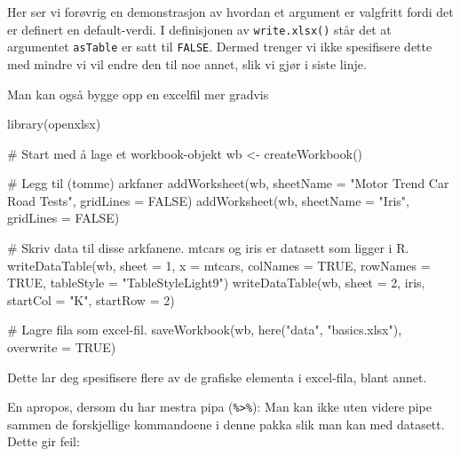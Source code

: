 \documentclass[
  letterpaper,
  DIV=11,
  numbers=noendperiod]{scrreprt}
\newenvironment{Shaded}{\begin{snugshade}}{\end{snugshade}}
\newcommand{\AttributeTok}[1]{\textcolor[rgb]{0.40,0.45,0.13}{#1}}
\newcommand{\CommentTok}[1]{\textcolor[rgb]{0.37,0.37,0.37}{#1}}
\newcommand{\ConstantTok}[1]{\textcolor[rgb]{0.56,0.35,0.01}{#1}}
\newcommand{\DecValTok}[1]{\textcolor[rgb]{0.68,0.00,0.00}{#1}}
\newcommand{\FunctionTok}[1]{\textcolor[rgb]{0.28,0.35,0.67}{#1}}
\newcommand{\NormalTok}[1]{\textcolor[rgb]{0.00,0.23,0.31}{#1}}
\newcommand{\OtherTok}[1]{\textcolor[rgb]{0.00,0.23,0.31}{#1}}
\newcommand{\StringTok}[1]{\textcolor[rgb]{0.13,0.47,0.30}{#1}}
\begin{document}
Her ser vi forøvrig en demonstrasjon av hvordan et argument er valgfritt
fordi det er definert en default-verdi. I definisjonen av
\texttt{write.xlsx()} står det at argumentet \texttt{asTable} er satt
til \texttt{FALSE}. Dermed trenger vi ikke spesifisere dette med mindre
vi vil endre den til noe annet, slik vi gjør i siste linje.

Man kan også bygge opp en excelfil mer gradvis

\begin{Shaded}
\begin{Highlighting}[]
\FunctionTok{library}\NormalTok{(openxlsx)}

\CommentTok{\# Start med å lage et workbook{-}objekt}
\NormalTok{wb }\OtherTok{\textless{}{-}} \FunctionTok{createWorkbook}\NormalTok{()}

\CommentTok{\# Legg til (tomme) arkfaner}
\FunctionTok{addWorksheet}\NormalTok{(wb, }\AttributeTok{sheetName =} \StringTok{"Motor Trend Car Road Tests"}\NormalTok{, }\AttributeTok{gridLines =} \ConstantTok{FALSE}\NormalTok{)}
\FunctionTok{addWorksheet}\NormalTok{(wb, }\AttributeTok{sheetName =} \StringTok{"Iris"}\NormalTok{, }\AttributeTok{gridLines =} \ConstantTok{FALSE}\NormalTok{)}

\CommentTok{\# Skriv data til disse arkfanene. \textasciigrave{}mtcars\textasciigrave{} og \textasciigrave{}iris\textasciigrave{} er datasett som ligger i R.}
\FunctionTok{writeDataTable}\NormalTok{(wb, }\AttributeTok{sheet =} \DecValTok{1}\NormalTok{, }\AttributeTok{x =}\NormalTok{ mtcars, }\AttributeTok{colNames =} \ConstantTok{TRUE}\NormalTok{, }\AttributeTok{rowNames =} \ConstantTok{TRUE}\NormalTok{, }\AttributeTok{tableStyle =} \StringTok{"TableStyleLight9"}\NormalTok{)}
\FunctionTok{writeDataTable}\NormalTok{(wb, }\AttributeTok{sheet =} \DecValTok{2}\NormalTok{, iris, }\AttributeTok{startCol =} \StringTok{"K"}\NormalTok{, }\AttributeTok{startRow =} \DecValTok{2}\NormalTok{)}

\CommentTok{\# Lagre fila som excel{-}fil.}
\FunctionTok{saveWorkbook}\NormalTok{(wb, }\FunctionTok{here}\NormalTok{(}\StringTok{"data"}\NormalTok{, }\StringTok{"basics.xlsx"}\NormalTok{), }\AttributeTok{overwrite =} \ConstantTok{TRUE}\NormalTok{)}
\end{Highlighting}
\end{Shaded}

Dette lar deg spesifisere flere av de grafiske elementa i excel-fila,
blant annet.

En apropos, dersom du har mestra pipa (\texttt{\%\textgreater{}\%}): Man
kan ikke uten videre pipe sammen de forskjellige kommandoene i denne
pakka slik man kan med datasett. Dette gir feil:
\end{document}
